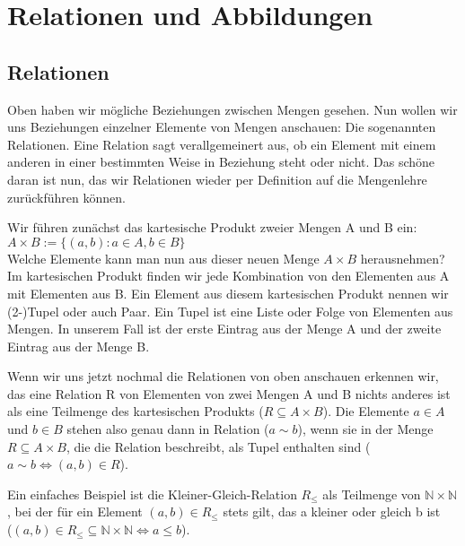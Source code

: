 \documentclass[parskip=full]{scrartcl}
\begin{document}
\section{Relationen und Abbildungen}
    \subsection{Relationen}
        Oben haben wir mögliche Beziehungen zwischen Mengen gesehen.
        Nun wollen wir uns Beziehungen einzelner Elemente von Mengen anschauen: Die sogenannten Relationen.
        Eine Relation sagt verallgemeinert aus, ob ein Element mit einem anderen in einer bestimmten Weise in Beziehung steht oder nicht.
        Das schöne daran ist nun, das wir Relationen wieder per Definition auf die Mengenlehre zurückführen können.

        Wir führen zunächst das kartesische Produkt zweier Mengen A und B ein:
        \\\quad\(A \times B := \{(a, b) : a \in A, b \in B\}\)
        \\Welche Elemente kann man nun aus dieser neuen Menge \(A \times B\) herausnehmen?
        Im kartesischen Produkt finden wir jede Kombination von den Elementen aus A mit Elementen aus B.
        Ein Element aus diesem kartesischen Produkt nennen wir (2-)Tupel oder auch Paar. 
        Ein Tupel ist eine Liste oder Folge von Elementen aus Mengen. 
        In unserem Fall ist der erste Eintrag aus der Menge A und der zweite Eintrag aus der Menge B.

        Wenn wir uns jetzt nochmal die Relationen von oben anschauen erkennen wir, 
        das eine Relation R von Elementen von zwei Mengen A und B nichts anderes ist als eine Teilmenge des kartesischen Produkts
        (\(R \subseteq A \times B\)).
        Die Elemente \(a \in A\) und \(b \in B\) stehen also genau dann in Relation (\(a \sim b\)), 
        wenn sie in der Menge \(R \subseteq A \times B\), die die Relation beschreibt, als Tupel enthalten sind
        (\(a \sim b \iff (a, b) \in R\)).

        Ein einfaches Beispiel ist die Kleiner-Gleich-Relation \(R_\leq\) als Teilmenge von \(\mathbb{N} \times \mathbb{N}\), 
        bei der für ein Element \((a, b) \in R_\leq\) stets gilt, das a kleiner oder gleich b ist 
        \\(\((a, b) \in R_\leq \subseteq \mathbb{N} \times \mathbb{N} \iff a \leq b\)). 
\end{document}
